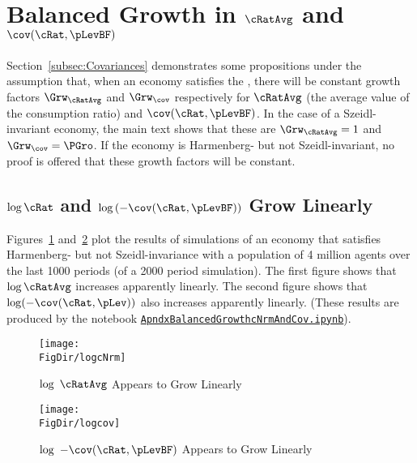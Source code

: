 \documentclass[\econtexRoot/BufferStockTheory]{subfiles}
\begin{document}
\hypertarget{ApndxBalancedGrowthCNrmAndCov}{}
\section{Balanced Growth in \texorpdfstring{$\cRatAvg$}{c} and \texorpdfstring{$\cov(\cRat,\pLevBF)$}{cov(c,p)}}\label{sec:ApndxBalancedGrowthCNrmAndCov}


Section~\ref{subsec:Covariances} demonstrates some propositions under the assumption that, when an economy satisfies the {\GIC}, there will be constant growth factors $\Grw_{\cRatAvg}$ and $\Grw_{\cov}$ respectively for $\cRatAvg$ (the average value of the consumption ratio) and $\cov(\cRat,\pLevBF)$.  In the case of a Szeidl-invariant economy, the main text shows that these are $\Grw_{\cRatAvg}=1$ and $\Grw_{\cov}=\PGro$.  If the economy is Harmenberg- but not Szeidl-invariant, no proof is offered that these growth factors will be constant.

\subsection{\texorpdfstring{$\log \cRat$}{log c} and \texorpdfstring{$\log \left(-\cov(\cRat,\pLevBF)\right)$}{log -cov(c,p)} Grow Linearly}
Figures~\ref{fig:logcNrm} and~\ref{fig:logcov} plot the results of simulations of an economy that satisfies Harmenberg- but not Szeidl-invariance with a population of 4 million agents over the last 1000 periods (of a 2000 period simulation).  The first figure shows that $\log \cRatAvg$ increases apparently linearly.  The second figure shows that $\log (-\cov(\cRat,\pLev))$ also increases apparently linearly.  (These results are produced by the notebook \href{https://github.com/econ-ark/BufferStockTheory/blob/master/Code/Python/ApndxBalancedGrowthcNrmAndCov.ipynb}{\texttt{ApndxBalancedGrowthcNrmAndCov.ipynb}}).

\pagebreak
\begin{figure}[ht]
  \centerline{
    \texttt{[image: \\FigDir/logcNrm]}
  }
  \caption{$\log ~\cRatAvg$ Appears to Grow Linearly}\label{fig:logcNrm}
\end{figure}
\begin{figure}[ht]
  \centerline{
    \texttt{[image: \\FigDir/logcov]}
  }
  \caption{$\log ~-\cov(\cRat,\pLevBF)$ Appears to Grow Linearly}\label{fig:logcov}
\end{figure}
\end{document}
